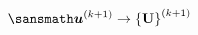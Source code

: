 \documentclass[preview]{standalone}
\begin{document}
$ \displaystyle \sansmath
 \boldsymbol{u}^{(k+1)} \rightarrow \left\lbrace \mathbf{U} \right\rbrace^{(k+1)}
$
\end{document}
